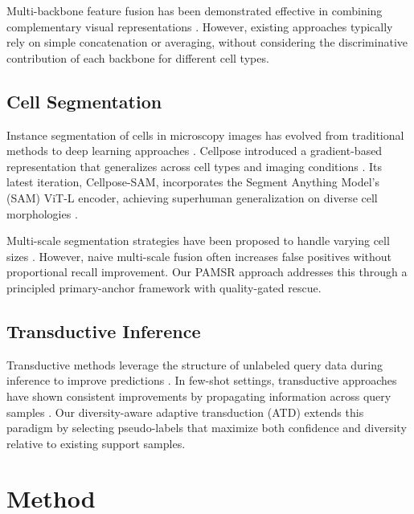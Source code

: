 \documentclass[preprint,review,12pt]{elsarticle}
\begin{document}
Multi-backbone feature fusion has been demonstrated effective in combining complementary visual representations \cite{li2023multimodal}. However, existing approaches typically rely on simple concatenation or averaging, without considering the discriminative contribution of each backbone for different cell types.

\subsection{Cell Segmentation}

Instance segmentation of cells in microscopy images has evolved from traditional methods to deep learning approaches \cite{stringer2021cellpose}. Cellpose introduced a gradient-based representation that generalizes across cell types and imaging conditions \cite{stringer2021cellpose}. Its latest iteration, Cellpose-SAM, incorporates the Segment Anything Model's (SAM) ViT-L encoder, achieving superhuman generalization on diverse cell morphologies \cite{pachitariu2025cellpose}.

Multi-scale segmentation strategies have been proposed to handle varying cell sizes \cite{lee2023multi}. However, naive multi-scale fusion often increases false positives without proportional recall improvement. Our PAMSR approach addresses this through a principled primary-anchor framework with quality-gated rescue.

\subsection{Transductive Inference}

Transductive methods leverage the structure of unlabeled query data during inference to improve predictions \cite{liu2019transductive}. In few-shot settings, transductive approaches have shown consistent improvements by propagating information across query samples \cite{martin2024transductive}. Our diversity-aware adaptive transduction (ATD) extends this paradigm by selecting pseudo-labels that maximize both confidence and diversity relative to existing support samples.


\section{Method}
\label{sec:method}
\end{document}
